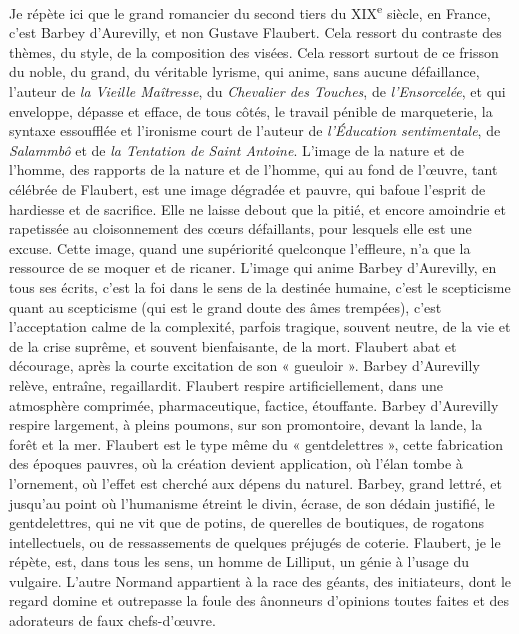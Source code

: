 \documentclass[french,twoside]{book} %
\begin{document}
Je répète ici que le grand romancier du second tiers du XIX\textsuperscript{e} siècle, en France, c’est Barbey d’Aurevilly, et non Gustave Flaubert. Cela ressort du contraste des thèmes, du style, de la composition des visées. Cela ressort surtout de ce frisson du noble, du grand, du véritable lyrisme, qui anime, sans aucune défaillance, l’auteur de {\itshape la Vieille Maîtresse}, du {\itshape Chevalier des Touches}, de {\itshape l’Ensorcelée}, et qui enveloppe, dépasse et efface, de tous côtés, le travail pénible de marqueterie, la syntaxe essoufflée et l’ironisme court de l’auteur de {\itshape l’Éducation sentimentale}, de {\itshape Salammbô} et de {\itshape la Tentation de Saint Antoine}. L’image de la nature et de l’homme, des rapports de la nature et de l’homme, qui au fond de l’œuvre, tant célébrée de Flaubert, est une image dégradée et pauvre, qui bafoue l’esprit de hardiesse et de sacrifice. Elle ne laisse debout que la pitié, et encore amoindrie et rapetissée au cloisonnement des cœurs défaillants, pour lesquels elle est une excuse. Cette image, quand une supériorité quelconque l’effleure, n’a que la ressource de se moquer et de ricaner. L’image qui anime Barbey d’Aurevilly, en tous ses écrits, c’est la foi dans le sens de la destinée humaine, c’est le scepticisme quant au scepticisme (qui est le grand doute des âmes trempées), c’est l’acceptation calme de la complexité, parfois tragique, souvent neutre, de la vie et de la crise suprême, et souvent bienfaisante, de la mort. Flaubert abat et décourage, après la courte excitation de son « gueuloir ». Barbey d’Aurevilly relève, entraîne, regaillardit. Flaubert respire artificiellement, dans une atmosphère comprimée, pharmaceutique, factice, étouffante. Barbey d’Aurevilly respire largement, à pleins poumons, sur son promontoire, devant la lande, la forêt et la mer. Flaubert est le type même du « gentdelettres », cette fabrication des époques pauvres, où la création devient application, où l’élan tombe à l’ornement, où l’effet est cherché aux dépens du naturel. Barbey, grand lettré, et jusqu’au point où l’humanisme étreint le divin, écrase, de son dédain justifié, le gentdelettres, qui ne vit que de potins, de querelles de boutiques, de rogatons intellectuels, ou de ressassements de quelques préjugés de coterie. Flaubert, je le répète, est, dans tous les sens, un homme de Lilliput, un génie à l’usage du vulgaire. L’autre Normand appartient à la race des géants, des initiateurs, dont le regard domine et outrepasse la foule des ânonneurs d’opinions toutes faites et des adorateurs de faux chefs-d’œuvre.\par
\end{document}
